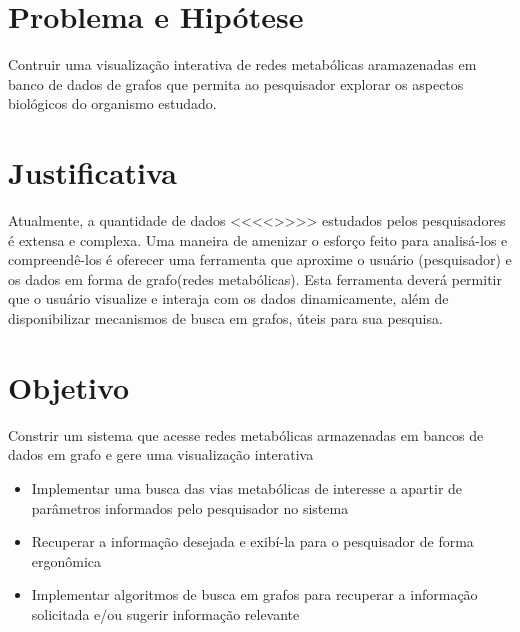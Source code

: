 

\section{Problema e Hipótese}

\indent 
Contruir uma visualização interativa de redes metabólicas aramazenadas em banco de dados de grafos que permita ao pesquisador explorar os aspectos biológicos do organismo estudado.



\section{Justificativa}

\indent 

Atualmente, a quantidade de dados <<<<>>>> estudados pelos pesquisadores é extensa e complexa. Uma maneira de amenizar o esforço feito para analisá-los e compreendê-los é oferecer uma ferramenta que aproxime o usuário (pesquisador) e os dados em forma de grafo(redes metabólicas). Esta ferramenta deverá permitir que o usuário visualize e interaja com os dados dinamicamente, além de disponibilizar mecanismos de busca em grafos, úteis para sua pesquisa.


\section{Objetivo}

\indent 
Constrir um sistema que acesse redes metabólicas armazenadas em bancos de dados em grafo e gere uma visualização interativa
\begin{itemize}
 \item Implementar uma busca das vias metabólicas de interesse a apartir de parâmetros informados pelo pesquisador no sistema
 \item Recuperar a informação desejada e exibí-la para o pesquisador de forma ergonômica
 \item Implementar algoritmos de busca em grafos para recuperar a informação solicitada e/ou sugerir informação relevante
\end{itemize}

